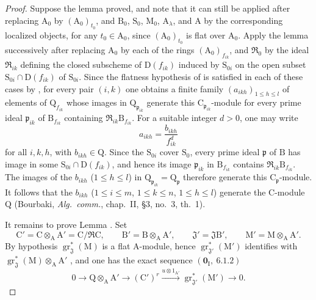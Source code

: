 \begin{proof}
Suppose the lemma proved, and note that it can still be applied after replacing $\mathrm{A}_0$ by $(\mathrm{A}_0)_{t_0}$, and $\mathrm{B}_0$, $\mathrm{S}_0$, $\mathrm{M}_0$, $\mathrm{A}_\lambda$, and $\mathrm{A}$ by the corresponding localized objects, for any $t_0\in\mathrm{A}_0$, since $(\mathrm{A}_0)_{t_0}$ is flat over $\mathrm{A}_0$. Apply the lemma successively after replacing $\mathrm{A}_0$ by each of the rings $(\mathrm{A}_0)_{f_{ik}}$, and $\mathfrak{R}_0$ by the ideal $\mathfrak{R}_{ik}$ defining the closed subscheme of $\mathrm{D}(f_{ik})$ induced by $\mathrm{S}_{0i}$ on the open subset $\mathrm{S}_{0i}\cap\mathrm{D}(f_{ik})$ of $\mathrm{S}_{0i}$. Since the flatness hypothesis of  is satisfied in each of these cases by , for every pair $(i,k)$ one obtains a finite family $(a_{ikh})_{1\leqslant h\leqslant l}$ of elements of $\mathrm{Q}_{f_{ik}}$ whose images in $\mathrm{Q}_{\mathfrak{p}_{ik}}$ generate this $\mathrm{C}_{\mathfrak{p}_{ik}}$-module for every prime ideal $\mathfrak{p}_{ik}$ of $\mathrm{B}_{f_{ik}}$ containing $\mathfrak{R}_{ik}\mathrm{B}_{f_{ik}}$. For a suitable integer $d>0$, one may write
\[
  a_{ikh}=\frac{b_{ikh}}{f_{ik}^{d}}
\]
for all $i,k,h$, with $b_{ikh}\in\mathrm{Q}$. Since the $\mathrm{S}_{0i}$ cover $\mathrm{S}_0$, every prime ideal $\mathfrak{p}$ of $\mathrm{B}$ has image in some $\mathrm{S}_{0i}\cap\mathrm{D}(f_{ik})$, and hence its image $\mathfrak{p}_{ik}$ in $\mathrm{B}_{f_{ik}}$ contains $\mathfrak{R}_{ik}\mathrm{B}_{f_{ik}}$. The images of the $b_{ikh}$ ($1\leqslant h\leqslant l$) in $\mathrm{Q}_{\mathfrak{p}_{ik}}=\mathrm{Q}_{\mathfrak{p}}$ therefore generate this $\mathrm{C}_{\mathfrak{p}}$-module. It follows that the $b_{ikh}$ ($1\leqslant i\leqslant m$, $1\leqslant k\leqslant n$, $1\leqslant h\leqslant l$) generate the $\mathrm{C}$-module $\mathrm{Q}$ (Bourbaki, \emph{Alg.\ comm.}, chap.~II, \S3, no.~3, th.~1).

It remains to prove Lemma . Set
\[
  \mathrm{C}'=\mathrm{C}\otimes_\mathrm{A}\mathrm{A}'=\mathrm{C}/\mathfrak{R}\mathrm{C},\qquad
  \mathrm{B}'=\mathrm{B}\otimes_\mathrm{A}\mathrm{A}',\qquad
  \mathfrak{J}'=\mathfrak{J}\mathrm{B}',\qquad
  \mathrm{M}'=\mathrm{M}\otimes_\mathrm{A}\mathrm{A}'.
\]
By hypothesis $\operatorname{gr}^*_\mathfrak{J}(\mathrm{M})$ is a flat $\mathrm{A}$-module, hence $\operatorname{gr}^*_{\mathfrak{J}'}(\mathrm{M}')$ identifies with $\operatorname{gr}^*_\mathfrak{J}(\mathrm{M})\otimes_\mathrm{A}\mathrm{A}'$ , and one has the exact sequence $(\mathbf{0}_\mathrm{I},~6.1.2)$
\begin{equation}
  0\longrightarrow\mathrm{Q}\otimes_\mathrm{A}\mathrm{A}'
  \longrightarrow(\mathrm{C}')^r
  \xrightarrow{u\otimes 1_{\mathrm{A}'}}
  \operatorname{gr}^*_{\mathfrak{J}'}(\mathrm{M}')
  \longrightarrow 0.
  \tag{11.2.9.7}
\end{equation}


\end{proof}
